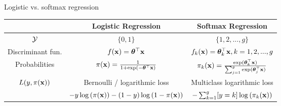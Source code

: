 \documentclass[11pt,compress,t,notes=noshow, xcolor=table]{beamer}
\begin{document}
\begin{vbframe}{Logistic vs. softmax regression} 

\begin{scriptsize}
\begin{table}[]
\bgroup
\def\arraystretch{2}%
\begin{tabular}{ccc}
& Logistic Regression & Softmax Regression \\ \hline
$\mathcal{Y}$ & $\{0, 1\}$ & $\{1, 2, ..., g\}$ \\[0.5cm]
Discriminant fun. & $f(\mathbf{x}) = \bm{\theta}^\top \mathbf{x}$ & $f_k(\mathbf{x}) = \bm{\theta}_{k}^{\top} \mathbf{x}, k = 1, 2, ..., g$ \\[0.5cm]
Probabilities & $\pi(\mathbf{x}) = \frac{1}{1 + \exp\left(-\bm{\theta}^\top \mathbf{x}\right)}$ & $\pi_k(\mathbf{x}) = \frac{\exp(\bm{\theta}_k^\top \mathbf{x})}{\sum_{j = 1}^g \exp(\bm{\theta}_j^\top \mathbf{x}) }$ \\[0.5cm]
$L(y, \pi(\mathbf{x}))$ & Bernoulli / logarithmic loss & Multiclass logarithmic loss\\[-0.3cm]
& $-y \log \left(\pi(\mathbf{x})\right) - (1 - y) \log \left(1 - \pi(\mathbf{x})\right)$  & $ - \sum_{k = 1}^g [y = k] \log\left(\pi_k(\mathbf{x})\right)$ \\
\end{tabular}
\egroup
\end{table}
\end{scriptsize}

\end{vbframe}
\end{document}
